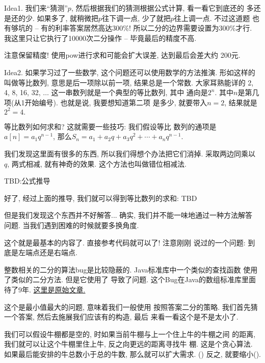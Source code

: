 Idea1. 我们来``猜测''$p$, 然后根据我们的猜测根据公式计算, 看一看它到底还的
多还是还的少. 如果多了, 就稍微把$p$往下调一点, 少了就把$p$往上调一点. 不过这道题
也有够坑的 -- 有的利率答案居然高达300\%! 所以二分的边界需要设置为300\%才行. 
我这里只让它执行了10000次二分操作 -- 毕竟最后的精度不高. 

\begin{remark}
    注意保留精度! 使用pow进行求和可能会扩大误差, 达到最后会差大约
    200元. 
\end{remark}

Idea2. 如果学习过了一些数学, 这个问题还可以使用数学的方法推演. 形如这样的
叫做等比数列, 意思是后一项除以前一项, 结果总是一个常数. 大家耳熟能详的
2, 4, 8, 16, 32, $\dots$ 这一串数列就是一个典型的等比数列, 其中
通向是$2^n$. 其中$n$是第几项(从1开始编号). 也就是说, 我要想知道第二项
是多少, 就要带入$n=2$, 结果就是$2^2=4.$ 

 等比数列如何求和? 这就需要一些技巧: 我们假设等比
数列的通项是$a[n]=a_1q^{n-1}$, 
那么$S_n=a_1 + a_2q + a_3 q^2 +\cdots +a_n q^{n-1}$. 

我们发现这里面有很多的东西, 所以我们得想个办法把它们消掉. 采取两边同乘以
$q$, 两式相减, 就有神奇的效果. 这个方法也叫做错位相减法. 

TBD:公式推导

好了, 经过上面的推导, 我们就可以得到等比数列的求和: TBD

但是我们发现这个东西并不好解答... 确实, 我们并不能一味地通过一种方法解答
问题. 当我们遇到困难的时候就要多换角度. 

 这个就是最基本的内容了. 直接参考代码就可以了! 注意刚刚
说过的一个问题: 到底是左端点还是右端点. 

\begin{remark}
    整数相关的二分的算法bug是比较隐蔽的. Java标准库中一个类似的查找函数
    使用了类似的二分方法. 但是它使用了
    导致了问题. 这个Bug在Java的数组标准库里面待了9年. 
    \href{https://dev.to/matheusgomes062/a-bug-was-found-in-java-after-almost-9-years-of-hiding-2d4k}{这里是原始文章.}
\end{remark}

 这个是最小值最大的问题, 意味着我们一般使用
按照答案二分的策略. 我们首先猜一个答案, 然后去施展我们应该有的构造, 最后
来看一看这个是不是太小了. 

我们可以假设牛棚都是空的, 时如果当前牛棚与上一个住上牛的牛棚之间
的距离, 我们就可以让这个牛棚里住上牛, 反之向更远的距离寻找牛
棚. 这是个贪心算法. 如果最后能安排的牛总数小于总的牛数, 那么就可以扩大需求. 
() 
反之, 就要缩小(). 

